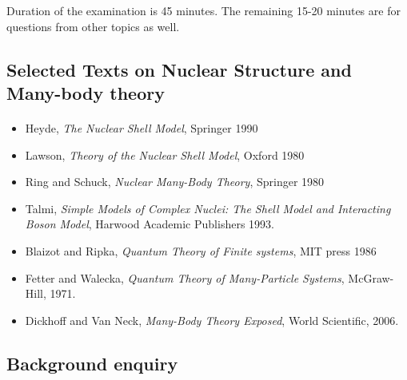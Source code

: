 \documentclass[%
twoside,                 %
final,                   %
10pt]{article}
\begin{document}
\noindent
Duration of the examination is 45 minutes. The remaining 15-20 minutes are for questions from other topics as well.




\subsection*{Selected Texts on Nuclear Structure and Many-body theory}

\paragraph{}
\begin{itemize}
\item Heyde, \emph{The Nuclear Shell Model}, Springer 1990

\item Lawson, \emph{Theory of the Nuclear Shell Model}, Oxford 1980

\item Ring and Schuck, \emph{Nuclear Many-Body Theory}, Springer 1980

\item Talmi, \emph{Simple Models of Complex Nuclei: The Shell Model and Interacting Boson Model}, Harwood Academic Publishers 1993.

\item Blaizot and Ripka, \emph{Quantum Theory of Finite systems}, MIT press 1986

\item Fetter and Walecka, \emph{Quantum Theory of Many-Particle Systems}, McGraw-Hill, 1971.

\item Dickhoff and Van Neck, \emph{Many-Body Theory Exposed}, World Scientific, 2006.
\end{itemize}

\noindent




\subsection*{Background enquiry}

\end{document}
